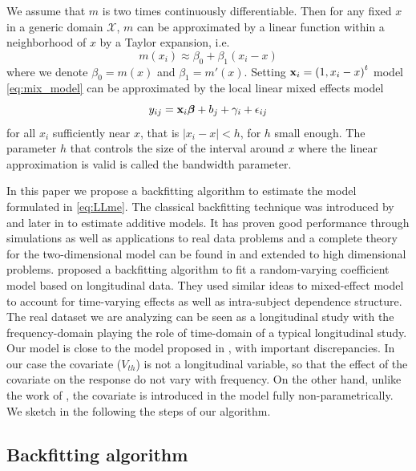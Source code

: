 \documentclass[sn-mathphys]{sn-jnl}%
\def\bbeta{{\boldsymbol{\beta}}}
\theoremstyle{thmstyleone}%
\theoremstyle{thmstyletwo}%
\theoremstyle{thmstylethree}%
\begin{document}
\bigskip
We assume that $m$ is two times continuously differentiable. Then for any fixed $x$ in a generic domain $\mathcal{X}$, $m$ can be approximated by a linear function within a neighborhood of $x$ by a Taylor expansion, i.e.
$$m(x_i)\approx \beta_0 +\beta_1(x_i-x)$$
where we denote $\beta_0=m(x)$ and $\beta_1=m'(x)$. Setting ${\bf x}_i=\left(1,x_i-x\right)^t$ model \eqref{eq:mix_model} can be approximated by the local linear mixed effects model
\begin{equation}\label{eq:LLme}
y_{ij} = {\bf x}_i \bbeta + b_j+ \gamma_i + \epsilon_{ij}
\end{equation}
for all $x_i$ sufficiently near $x$, that is $|x_i-x|<h$, for $h$ small enough. The parameter $h$ that controls the size of the interval around $x$  where the linear approximation is valid is called the bandwidth parameter. 


In this paper we propose a backfitting algorithm to estimate the model formulated in \eqref{eq:LLme}. 
The classical backfitting technique was introduced by \cite{BHT1989} and later in \cite{HT1990} to estimate additive models. It has proven good performance through simulations as well as applications to real data problems and a complete theory  for the two-dimensional model can be found in \cite{OR1997} and \cite{Opsomer2000} extended to high dimensional problems. \cite{WL2004} proposed  a backfitting algorithm to fit a random-varying coefficient model based on longitudinal data. They used similar ideas to mixed-effect model to account for time-varying effects as well as intra-subject dependence structure. The real dataset we are analyzing can be seen as a longitudinal study with the frequency-domain playing the role of time-domain of a typical longitudinal study.  Our model is close to the model proposed in \cite{WL2004}, with important discrepancies. In our case the covariate ($V_{th}$) is not a longitudinal variable, so that  the effect of the covariate on the response do not vary with frequency. On the other hand, unlike the work of \cite{WL2004}, the covariate is introduced in the model fully non-parametrically. We sketch in the following the steps of our algorithm.


\subsection{Backfitting algorithm}\label{sec:backfit}
\end{document}
